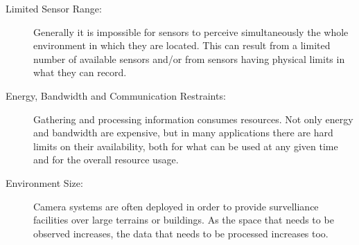 \begin{description}

\item[Limited Sensor Range:] Generally it is impossible for sensors to perceive simultaneously the
    whole environment in which they are located. This can result from a limited number of available
    sensors and/or from sensors having physical limits in what they can record.

%


\item[Energy, Bandwidth and Communication Restraints:] Gathering and processing information consumes
    resources. Not only energy and bandwidth are expensive, but in many applications there are hard
    limits on their availability, both for what can be used at any given time and for the overall
    resource usage.

\item[Environment Size:] Camera systems are often deployed in order to provide survelliance
    facilities over large terrains or buildings. As the space that needs to be observed increases, the
    data that needs to be processed increases too.


\end{description}

